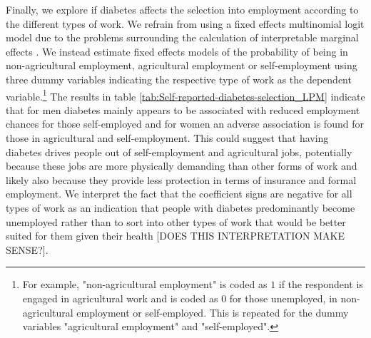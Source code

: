 \documentclass[12pt,english,british]{article}
\begin{document}
Finally, we explore if diabetes affects the selection into employment according to the different types of work. We refrain from using a fixed effects multinomial logit model due to the problems surrounding the calculation of interpretable marginal effects \citep{Pforr2014}. We instead estimate fixed effects models of the probability of being in non-agricultural employment, agricultural employment or self-employment using three dummy variables indicating the respective type of work as the dependent variable.\footnote{For example, "non-agricultural employment" is coded as $1$ if the respondent is engaged in agricultural work and is coded as $0$ for those unemployed, in non-agricultural employment or self-employed. This is repeated for the dummy variables "agricultural employment" and "self-employed".} The results in table \ref{tab:Self-reported-diabetes-selection_LPM} indicate that for men diabetes mainly appears to be associated with reduced employment chances for those self-employed and for women an adverse association is found for those in agricultural and self-employment. This could suggest that having diabetes drives people out of self-employment and agricultural jobs, potentially because these jobs are more physically demanding than other forms of work and likely also because they provide less protection in terms of insurance and formal employment. We interpret the fact that the coefficient signs are negative for all types of work as an indication that people with diabetes predominantly become unemployed rather than to sort into other types of work that would be better suited for them given their health [DOES THIS INTERPRETATION MAKE SENSE?].
\end{document}
